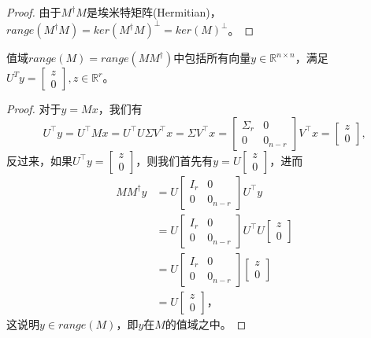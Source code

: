 \begin{subappendices}
\begin{proof}
  由于$M^{\dagger} M$是埃米特矩阵(Hermitian)，$range(M^{\dagger} M) = ker(M^{\dagger} M)^{\bot} = ker(M)^{\bot}$。
\end{proof}

值域$range (M) = range(MM^{\dagger})$中包括所有向量$y \in \mathbb{R}^{n \times n}$，满足$U^T y = \begin{bmatrix} z \\ 0 \end{bmatrix}, z \in \mathbb{R}^{r}$。
\begin{proof}
  对于$y=Mx$，我们有
  \begin{equation*}
      U^{\top} y = U^{\top} M x = U^{\top} U \Sigma V^{\top} x = \Sigma V^{\top} x = \begin{bmatrix}
      \Sigma_{r} & 0 \\ 0 & 0_{n-r}
    \end{bmatrix} V^{\top}  x = \begin{bmatrix} z \\ 0 \end{bmatrix},
  \end{equation*}
  反过来，如果$U^{\top} y = \begin{bmatrix} z \\ 0 \end{bmatrix}$，则我们首先有$y = U \begin{bmatrix} z \\ 0 \end{bmatrix}$，进而
  \begin{equation*}
    \begin{split}
      MM^{\dagger} y &= U \begin{bmatrix}
      I_r & 0 \\ 0 & 0_{n-r}
    \end{bmatrix} U^{\top} y \\
    &= U \begin{bmatrix}
    I_r & 0 \\ 0 & 0_{n-r}
  \end{bmatrix} U^{\top} U
  \begin{bmatrix}
  z \\ 0
  \end{bmatrix} \\
  & = U \begin{bmatrix}
  I_r & 0 \\ 0 & 0_{n-r}
\end{bmatrix}
  \begin{bmatrix}
  z \\ 0
  \end{bmatrix} \\
  & = U \begin{bmatrix}
  z \\ 0
  \end{bmatrix}，
    \end{split}
  \end{equation*}
这说明$y \in range(M)$，即$y$在$M$的值域之中。
\end{proof}


\end{subappendices}
